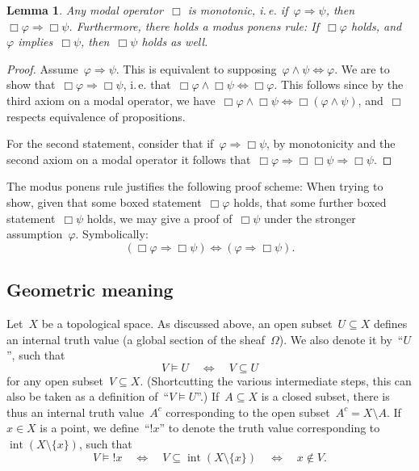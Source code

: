 \documentclass[10pt]{amsart}
\makeatletter
\theoremstyle{definition}
\theoremstyle{plain}
\newtheorem{lemma}[defn]{Lemma}
\theoremstyle{remark}
\DeclareMathOperator{\Int}{int}
\newcommand{\?}{\,{:}\,}
\renewcommand{\_}{\mathpunct{.}\,}
\newcommand{\notat}[1]{{!#1}}
\newcommand{\ie}{i.\,e.\@\xspace}
\makeatother
\begin{document}
\begin{lemma}Any modal operator~$\Box$ is monotonic, \ie if~$\varphi
\Rightarrow \psi$, then~$\Box\varphi \Rightarrow \Box\psi$. Furthermore, there
holds a modus ponens rule: If~$\Box\varphi$ holds, and~$\varphi$
implies~$\Box\psi$, then~$\Box\psi$ holds as well.\end{lemma}
\begin{proof}Assume~$\varphi \Rightarrow \psi$. This is equivalent to
supposing~$\varphi \wedge \psi \Leftrightarrow \varphi$. We are to show
that~$\Box\varphi \Rightarrow \Box\psi$, \ie that~$\Box\varphi \wedge
\Box\psi \Leftrightarrow \Box\varphi$. This follows since by the third
axiom on a modal operator, we have~$\Box\varphi \wedge \Box\psi \Leftrightarrow
\Box(\varphi \wedge \psi)$, and~$\Box$ respects equivalence of propositions.

For the second statement, consider that if~$\varphi \Rightarrow \Box\psi$, by
monotonicity and the second axiom on a modal operator it follows
that~$\Box\varphi \Rightarrow \Box\Box\psi \Rightarrow \Box\psi$.
\end{proof}

The modus ponens rule justifies the following proof scheme: When trying to
show, given that some boxed statement~$\Box\varphi$ holds, that some further
boxed statement~$\Box\psi$ holds, we may give a proof of~$\Box\psi$ under the
stronger assumption~$\varphi$. Symbolically:
\[ (\Box\varphi \Rightarrow \Box\psi) \Longleftrightarrow
  (\varphi \Rightarrow \Box\psi). \]


\subsection{Geometric meaning}\label{sect:modalities-geometric-meaning}
Let~$X$ be a topological space. As discussed
above, an open subset~$U \subseteq X$ defines an internal truth value (a global
section of the sheaf~$\Omega$). We also denote it by~``$U$'', such that
\[ V \models U \quad\Longleftrightarrow\quad V \subseteq U \]
for any open subset~$V \subseteq X$. (Shortcutting the various intermediate
steps, this can also be taken as a definition of~``$V \models U$''.)
If~$A \subseteq X$ is a closed subset, there is thus an internal truth
value~$A^c$ corresponding to the open subset~$A^c = X \setminus A$. If~$x \in
X$ is a point, we define~``$\notat{x}$'' to denote the truth value
corresponding to~$\Int(X \setminus \{x\})$, such that
\[ V \models \notat{x} \quad\Longleftrightarrow\quad V \subseteq \Int(X
\setminus \{ x \}) \quad\Longleftrightarrow\quad x \not\in V. \]
\end{document}
